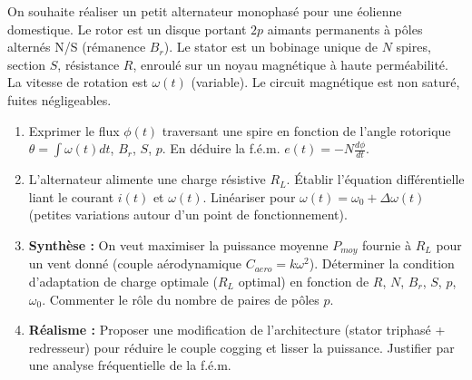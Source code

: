 \documentclass[11pt]{article}
\begin{document}
\begin{exercice}
On souhaite réaliser un petit alternateur monophasé pour une éolienne domestique. Le rotor est un disque portant $2p$ aimants permanents à pôles alternés N/S (rémanence $B_r$). Le stator est un bobinage unique de $N$ spires, section $S$, résistance $R$, enroulé sur un noyau magnétique à haute perméabilité. La vitesse de rotation est $\omega(t)$ (variable). Le circuit magnétique est non saturé, fuites négligeables.
\begin{enumerate}
    \item Exprimer le flux $\phi(t)$ traversant une spire en fonction de l'angle rotorique $\theta = \int \omega(t)dt$, $B_r$, $S$, $p$. En déduire la f.é.m. $e(t) = -N\frac{d\phi}{dt}$.
    \item L'alternateur alimente une charge résistive $R_L$. Établir l'équation différentielle liant le courant $i(t)$ et $\omega(t)$. Linéariser pour $\omega(t) = \omega_0 + \Delta\omega(t)$ (petites variations autour d'un point de fonctionnement).
    \item \textbf{Synthèse :} On veut maximiser la puissance moyenne $P_{moy}$ fournie à $R_L$ pour un vent donné (couple aérodynamique $C_{aero} = k \omega^2$). Déterminer la condition d'adaptation de charge optimale ($R_L$ optimal) en fonction de $R$, $N$, $B_r$, $S$, $p$, $\omega_0$. Commenter le rôle du nombre de paires de pôles $p$.
    \item \textbf{Réalisme :} Proposer une modification de l'architecture (stator triphasé + redresseur) pour réduire le couple cogging et lisser la puissance. Justifier par une analyse fréquentielle de la f.é.m.
\end{enumerate}
\end{exercice}
\end{document}
